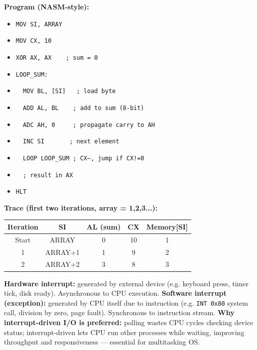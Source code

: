 \documentclass[11pt]{article}
\begin{document}
\begin{corrige}[Exercise 4]
\textbf{Program (NASM-style):}
\begin{itemize}
\item[] \texttt{MOV SI, ARRAY}
\item[] \texttt{MOV CX, 10}
\item[] \texttt{XOR AX, AX\ \ \ \ ; sum = 0}
\item[] \texttt{LOOP\_SUM:}
\item[] \texttt{\ \ MOV BL, [SI]\ \ \ ; load byte}
\item[] \texttt{\ \ ADD AL, BL\ \ \ \ ; add to sum (8-bit)}
\item[] \texttt{\ \ ADC AH, 0\ \ \ \ \ ; propagate carry to AH}
\item[] \texttt{\ \ INC SI\ \ \ \ \ \ \ ; next element}
\item[] \texttt{\ \ LOOP LOOP\_SUM ; CX--, jump if CX!=0}
\item[] \texttt{\ \ ; result in AX}
\item[] \texttt{HLT}
\end{itemize}
\textbf{Trace (first two iterations, array = 1,2,3...):}
\begin{center}
\begin{tabular}{|c|c|c|c|c|}
\hline
\rowcolor{popblueL} Iteration & SI & AL (sum) & CX & Memory[SI] \\ \hline
Start & ARRAY & 0 & 10 & 1 \\ \hline
1 & ARRAY+1 & 1 & 9 & 2 \\ \hline
2 & ARRAY+2 & 3 & 8 & 3 \\ \hline
\end{tabular}
\end{center}
\end{corrige}

\begin{corrige}[Exercise 5]
\textbf{Hardware interrupt:} generated by external device (e.g. keyboard press, timer tick, disk ready). Asynchronous to CPU execution. \textbf{Software interrupt (exception):} generated by CPU itself due to instruction (e.g. \texttt{INT 0x80} system call, division by zero, page fault). Synchronous to instruction stream. \textbf{Why interrupt-driven I/O is preferred:} polling wastes CPU cycles checking device status; interrupt-driven lets CPU run other processes while waiting, improving throughput and responsiveness — essential for multitasking OS.
\end{corrige}

\newpage
\end{document}

